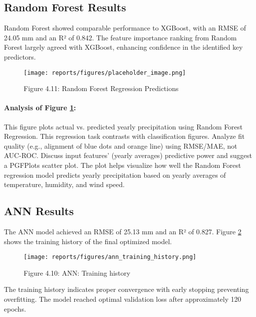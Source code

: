 \documentclass[12pt]{article}
\begin{document}
\subsection{Random Forest Results}
\label{subsec:rf_results}

Random Forest showed comparable performance to XGBoost, with an RMSE of 24.05 mm and an R² of 0.842. The feature importance ranking from Random Forest largely agreed with XGBoost, enhancing confidence in the identified key predictors.

\begin{figure}[H]
    \centering
    \texttt{[image: reports/figures/placeholder\_image.png]} %
    \caption{Figure 4.11: Random Forest Regression Predictions}
    \label{fig:chap4_fig11_rf_regression_predictions}
\end{figure}

\paragraph{Analysis of Figure \ref{fig:chap4_fig11_rf_regression_predictions}:}
This figure plots actual vs. predicted yearly precipitation using Random Forest Regression. This regression task contrasts with classification figures. Analyze fit quality (e.g., alignment of blue dots and orange line) using RMSE/MAE, not AUC-ROC. Discuss input features’ (yearly averages) predictive power and suggest a PGFPlots scatter plot. The plot helps visualize how well the Random Forest regression model predicts yearly precipitation based on yearly averages of temperature, humidity, and wind speed.

\subsection{ANN Results}
\label{subsec:ann_results}

The ANN model achieved an RMSE of 25.13 mm and an R² of 0.827. Figure \ref{fig:chap4_fig10_ann_training_history} shows the training history of the final optimized model.

\begin{figure}[h]
\centering
\texttt{[image: reports/figures/ann\_training\_history.png]}
\caption{Figure 4.10: ANN: Training history}
\label{fig:chap4_fig10_ann_training_history}
\end{figure}

The training history indicates proper convergence with early stopping preventing overfitting. The model reached optimal validation loss after approximately 120 epochs.
\end{document}
